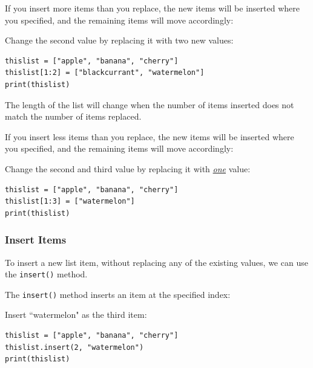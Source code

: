 \documentclass[12pt,a4paper]{article}
\newcommand{\code}[1]{%
	\colorbox{backcolour}{\lstinline{#1}}%
}
\begin{document}
If you insert more items than you replace, the new items will be inserted where
you specified, and the remaining items will move accordingly:

\begin{ebox}
Change the second value by replacing it with two new values:
	\begin{lstlisting}
thislist = ["apple", "banana", "cherry"]
thislist[1:2] = ["blackcurrant", "watermelon"]
print(thislist)
	\end{lstlisting}
\tcblower
	\begin{vercode}
	\end{vercode}
\end{ebox}

\begin{nbox}
The length of the list will change when the number of items inserted does not
	match the number of items replaced.
\end{nbox}

If you insert less items than you replace, the new items will be inserted where
you specified, and the remaining items will move accordingly:

\begin{ebox}
Change the second and third value by replacing it with \underline{\itshape one} value:
	\begin{lstlisting}
thislist = ["apple", "banana", "cherry"]
thislist[1:3] = ["watermelon"]
print(thislist)
	\end{lstlisting}
\tcblower
	\begin{vercode}
	\end{vercode}
\end{ebox}
\subsubsection{Insert Items}

To insert a new list item, without replacing any of the existing values, we can
use the \code{insert()} method.

The \code{insert()} method inserts an item at the specified index:

\begin{ebox}
Insert ``watermelon" as the third item:
	\begin{lstlisting}
thislist = ["apple", "banana", "cherry"]
thislist.insert(2, "watermelon")
print(thislist)
	\end{lstlisting}
\tcblower
	\begin{vercode}
	\end{vercode}
\end{ebox}
\end{document}
